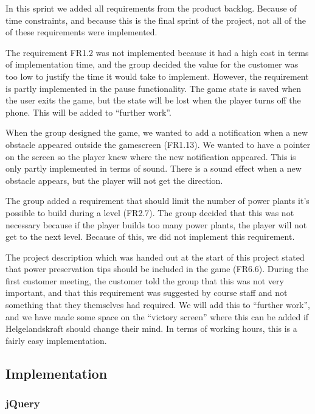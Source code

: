 	In this sprint we added all requirements from the product backlog. Because of time constraints,
	and because this is the final sprint of the project, not all of the of these requirements were
	implemented.

	The requirement FR1.2 was not implemented because it had a high cost in terms of implementation
	time, and the group decided the value for the customer was too low to justify the time it would
	take to implement. However, the requirement is partly implemented in the pause functionality.
	The game state is saved when the user exits the game, but the state will be lost when the player
	turns off the phone. This will be added to ``further work''.

	When the group designed the game, we wanted to add a notification when a new obstacle appeared
	outside the gamescreen (FR1.13). We wanted to have a pointer on the screen so the player knew
	where the new notification appeared. This is only partly implemented in terms of sound. There
	is a sound effect when a new obstacle appears, but the player will not get the direction.

	The group added a requirement that should limit the number of power plants it's possible to
	build during a level (FR2.7). The group decided that this was not necessary because if the
	player builds too many power plants, the player will not get to the next level. Because of this,
	we did not implement this requirement.

	The project description which was handed out at the start of this project stated that power
	preservation tips should be included in the game (FR6.6). During the first customer meeting,
	the customer told the group that this was not very important, and that this requirement was
	suggested by course staff and not something that they themselves had required. We will add
	this to ``further work'', and we have made some space on the ``victory screen'' where this can
	be added if Helgelandskraft should change their mind. In terms of working hours, this is a
	fairly easy implementation.

\subsection{Implementation}

	\subsubsection*{jQuery}

